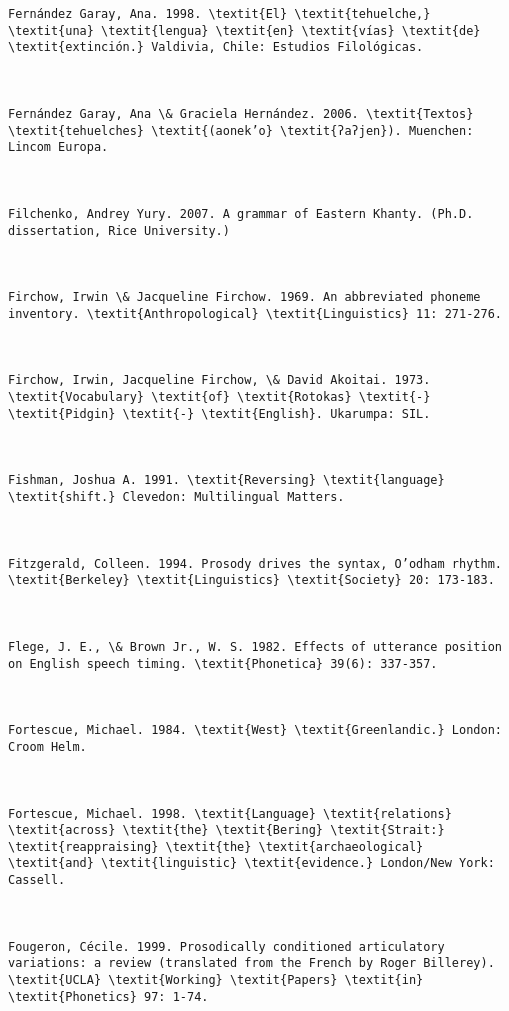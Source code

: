\begin{verbatim}
Fernández Garay, Ana. 1998. \textit{El} \textit{tehuelche,} \textit{una} \textit{lengua} \textit{en} \textit{vías} \textit{de} \textit{extinción.} Valdivia, Chile: Estudios Filológicas.



Fernández Garay, Ana \& Graciela Hernández. 2006. \textit{Textos} \textit{tehuelches} \textit{(aonek’o} \textit{ʔaʔjen}). Muenchen: Lincom Europa.



Filchenko, Andrey Yury. 2007. A grammar of Eastern Khanty. (Ph.D. dissertation, Rice University.)



Firchow, Irwin \& Jacqueline Firchow. 1969. An abbreviated phoneme inventory. \textit{Anthropological} \textit{Linguistics} 11: 271-276.



Firchow, Irwin, Jacqueline Firchow, \& David Akoitai. 1973. \textit{Vocabulary} \textit{of} \textit{Rotokas} \textit{-} \textit{Pidgin} \textit{-} \textit{English}. Ukarumpa: SIL.



Fishman, Joshua A. 1991. \textit{Reversing} \textit{language} \textit{shift.} Clevedon: Multilingual Matters.



Fitzgerald, Colleen. 1994. Prosody drives the syntax, O’odham rhythm. \textit{Berkeley} \textit{Linguistics} \textit{Society} 20: 173-183.



Flege, J. E., \& Brown Jr., W. S. 1982. Effects of utterance position on English speech timing. \textit{Phonetica} 39(6): 337-357.



Fortescue, Michael. 1984. \textit{West} \textit{Greenlandic.} London: Croom Helm.



Fortescue, Michael. 1998. \textit{Language} \textit{relations} \textit{across} \textit{the} \textit{Bering} \textit{Strait:} \textit{reappraising} \textit{the} \textit{archaeological} \textit{and} \textit{linguistic} \textit{evidence.} London/New York: Cassell.



Fougeron, Cécile. 1999. Prosodically conditioned articulatory variations: a review (translated from the French by Roger Billerey). \textit{UCLA} \textit{Working} \textit{Papers} \textit{in} \textit{Phonetics} 97: 1-74.




\end{verbatim}
